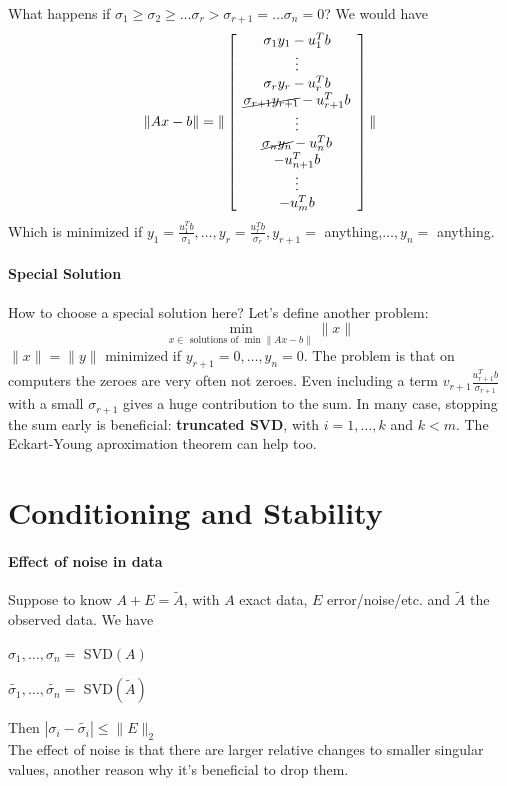\documentclass[10pt]{report}
\begin{document}
What happens if $\sigma_1\geq \sigma_2 \geq \ldots \sigma_r > \sigma_{r+1} = \ldots \sigma_n = 0$? We would have $$\|Ax-b\|=\|\left[\begin{array}{c}
\sigma_1y_1-u_1^Tb\\\vdots\\\sigma_ry_r-u_r^Tb\\\cancel{\sigma_{r+1}y_{r+1}}-u_{r+1}^Tb\\\vdots\\\cancel{\sigma_ny_n}-u_n^Tb\\-u_{n+1}^Tb\\\vdots\\-u_m^Tb
\end{array}\right]\|$$
Which is minimized if $y_1=\frac{u_1^Tb}{\sigma_1},\ldots,y_r=\frac{u_r^Tb}{\sigma_r},y_{r+1}=$ anything,$\ldots,y_n =$ anything.
\paragraph{Special Solution} How to choose a special solution here? Let's define another problem: $$\min_{x\in\text{ solutions of }\min\|Ax-b\|} \|x\|$$
$\|x\|=\|y\|$ minimized if $y_{r+1} = 0,\ldots,y_n = 0$. The problem is that on computers the zeroes are very often not zeroes. Even including a term $v_{r+1}\frac{u_{r+1}^Tb}{\sigma_{r+1}}$ with a small $\sigma_{r+1}$ gives a huge contribution to the sum. In many case, stopping the sum early is beneficial: \textbf{truncated SVD}, with $i=1,\ldots,k$ and $k<m$. The Eckart-Young aproximation theorem can help too.
\pagebreak
\section{Conditioning and Stability}
\paragraph{Effect of noise in data} Suppose to know $A+E = \tilde{A}$, with $A$ exact data, $E$ error/noise/etc. and $\tilde{A}$ the observed data. We have
\begin{list}{}{}
	\item $\sigma_1,\ldots,\sigma_n =$ SVD$(A)$
	\item $\tilde{\sigma_1},\ldots,\tilde{\sigma_n} =$ SVD$(\tilde{A})$
\end{list}
Then $|\sigma_i - \tilde{\sigma_i}| \leq \|E\|_2$\\
The effect of noise is that there are larger relative changes to smaller singular values, another reason why it's beneficial to drop them.
\end{document}
